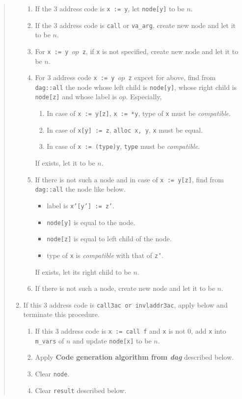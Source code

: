 \begin{quote}
\begin{enumerate}
\begin{enumerate}
\item If the 3 address code is {\tt{x := y}},
      let {\tt{node[y]}} to be $n$.
\item If the 3 address code is {\tt{call}} or {\tt{va\_arg}},
      create new node and let it to be $n$.
\item For {\tt{x := y $op$ z}}, if {\tt{x}} is not specified,
      create new node and let it to be $n$.
\item For 3 address code {\tt{x := y $op$ z}} expcet for above,
      find from {\tt{dag::all}} the node 
      whose left child is {\tt{node[y]}},
      whose right child is {\tt{node[z]}}
      and
      whose label is $op$. Especially,
\begin{enumerate}
\item In case of {\tt{x := y[z]}}, {\tt{x := *y}},
      type of {\tt{x}} must be {\it
      compatible}.
\item In case of {\tt{x[y] := z}}, {\tt{alloc x, y}},
      {\tt{x}} must be equal.
\item In case of {\tt{x := (type)y}}, {\tt{type}} must be
     {\it compatible}.
\end{enumerate}
      If exists, let it to be $n$.
\item \label{optimize_e109}
      If there is not such a node and in case of {\tt{x := y[z]}},
      find from {\tt{dag::all}} the node like below.
      \begin{itemize}
      \item label is {\tt{x'[y'] := z'}}.
      \item {\tt{node[y]}} is equal to the node.
      \item {\tt{node[z]}} is equal to left child of the node.
      \item type of {\tt{x}} is {\it compatible} with that of {\tt{z'}}.
      \end{itemize}
      If exists, let its right child to be $n$.
\item If there is not such a node, create new node and let it to be $n$.
\end{enumerate}
\item \label{optimize_e112}
      If this 3 address code is {\tt{call3ac} or {\tt{invladdr3ac}}},
      apply below and terminate this procedure.
      \begin{enumerate}
      \item If this 3 address code is {\tt{x := call f}} and {\tt{x}} 
            is not 0, add {\tt{x}} into {\tt{m\_vars}} of $n$ and
            update {\tt{node[x]}} to be $n$. 
      \item Apply {\bf Code generation algorithm from {\em dag}}
	    described below.
      \item Clear {\tt{node}}.
      \item Clear {\tt{result}} described below.
      \end{enumerate}


\end{enumerate}
\end{quote}
